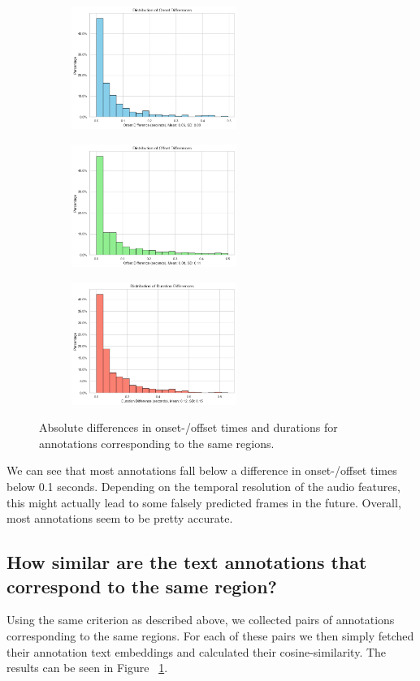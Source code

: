 \documentclass{article}
\begin{document}
\begin{figure}[htbp]
  \centering
  \begin{subfigure}[b]{0.33\textwidth}
    \includegraphics[width=\textwidth, height=4cm]{figs/onset_diffs.png}
  \end{subfigure}
  \hfill
  \begin{subfigure}[b]{0.33\textwidth}
    \includegraphics[width=\textwidth, height=4cm]{figs/offset_diffs.png}
  \end{subfigure}
  \hfill
  \begin{subfigure}[b]{0.33\textwidth}
    \includegraphics[width=\textwidth, height=4cm]{figs/duration_diffs.png}
  \end{subfigure}
  \caption{Absolute differences in onset-/offset times and durations for annotations corresponding to the same regions.}
  \label{fig:2_a}
\end{figure}

We can see that most annotations fall below a difference in onset-/offset times below 0.1 seconds. Depending on the temporal resolution of the audio features, this might actually lead to some falsely predicted frames in the future. Overall, most annotations seem to be pretty accurate.


\subsection{How similar are the text annotations that correspond to the same region?}
\label{sec:Annotation Quality:b1}
Using the same criterion as described above, we collected pairs of annotations corresponding to the same regions. For each of these pairs we then simply fetched their annotation text embeddings and calculated their cosine-similarity. The results can be seen in Figure ~\ref{fig:2_a}.
\end{document}

